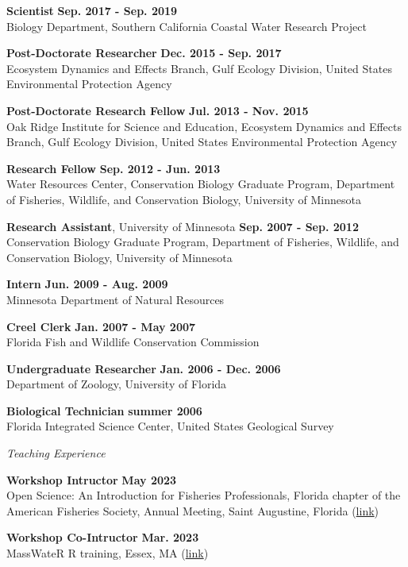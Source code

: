 \documentclass[letterpaper,12pt]{article}
\newcommand{\sectitle}[1]{\vspace{\baselineskip} \centerline{\large{\textit{#1}}}}
\begin{document}
{\bf Scientist} \hfill {\bf Sep. 2017 - Sep. 2019}\\
Biology Department, Southern California Coastal Water Research Project

{\bf Post-Doctorate Researcher} \hfill {\bf Dec. 2015 - Sep. 2017}\\
Ecosystem Dynamics and Effects Branch, Gulf Ecology Division, United States Environmental Protection Agency

{\bf Post-Doctorate Research Fellow} \hfill {\bf Jul. 2013 - Nov. 2015}\\
Oak Ridge Institute for Science and Education, Ecosystem Dynamics and Effects Branch, Gulf Ecology Division, United States Environmental Protection Agency

{\bf Research Fellow} \hfill {\bf Sep. 2012 - Jun. 2013} \\
Water Resources Center, Conservation Biology Graduate Program, Department of Fisheries, Wildlife, and Conservation Biology, University of Minnesota

{\bf Research Assistant}, University of Minnesota \hfill {\bf Sep. 2007 - Sep. 2012} \\
Conservation Biology Graduate Program, Department of Fisheries, Wildlife, and Conservation Biology, University of Minnesota

{\bf Intern} \hfill {\bf Jun. 2009 - Aug. 2009} \\
Minnesota Department of Natural Resources

{\bf Creel Clerk} \hfill {\bf Jan. 2007 - May 2007} \\
Florida Fish and Wildlife Conservation Commission

{\bf Undergraduate Researcher} \hfill {\bf Jan. 2006 - Dec. 2006} \\
Department of Zoology, University of Florida

{\bf Biological Technician} \hfill {\bf summer 2006} \\
Florida Integrated Science Center, United States Geological Survey

\sectitle{Teaching Experience}

{\bf Workshop Intructor} \hfill {\bf May 2023}\\
Open Science: An Introduction for Fisheries Professionals, Florida chapter of the American Fisheries Society, Annual Meeting, Saint Augustine, Florida ({\footnotesize\href{https://tbep-tech.github.io/flafs-os-workshop/}{link}})

{\bf Workshop Co-Intructor} \hfill {\bf Mar. 2023}\\
MassWateR R training, Essex, MA ({\footnotesize\href{https://massbays-tech.github.io/intro-to-r/}{link}})
\end{document}
